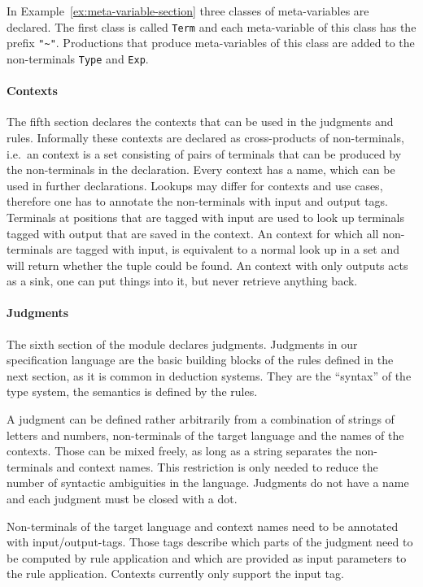 In Example~\ref{ex:meta-variable-section} three classes of
meta-variables are declared. The first class is called \verb|Term| and
each meta-variable of this class has the prefix
\verb|"~"|. Productions that produce meta-variables of this class are
added to the non-terminals \verb|Type| and \verb|Exp|.

\paragraph{Contexts} The fifth section declares the contexts that can
be used in the judgments and rules. Informally these contexts are
declared as cross-products of non-terminals, i.e.\ an context is a set
consisting of pairs of terminals that can be produced by the
non-terminals in the declaration. Every context has a name, which can
be used in further declarations. Lookups may differ for contexts and
use cases, therefore one has to annotate the non-terminals with input
and output tags. Terminals at positions that are tagged with input are
used to look up terminals tagged with output that are saved in the
context. An context for which all non-terminals are tagged with input,
is equivalent to a normal look up in a set and will return whether the
tuple could be found. An context with only outputs acts as a sink, one
can put things into it, but never retrieve anything back.

\paragraph{Judgments} The sixth section of the module declares
judgments. Judgments in our specification language are the basic
building blocks of the rules defined in the next section, as it is
common in deduction systems. They are the ``syntax'' of the type
system, the semantics is defined by the rules.

A judgment can be defined rather arbitrarily from a combination of
strings of letters and numbers, non-terminals of the target language
and the names of the contexts. Those can be mixed freely, as long as a
string separates the non-terminals and context names. This restriction
is only needed to reduce the number of syntactic ambiguities in the
language. Judgments do not have a name and each judgment must be
closed with a dot.

Non-terminals of the target language and context names need to be
annotated with input/output-tags. Those tags describe which parts of
the judgment need to be computed by rule application and which are
provided as input parameters to the rule application. Contexts
currently only support the input tag.

